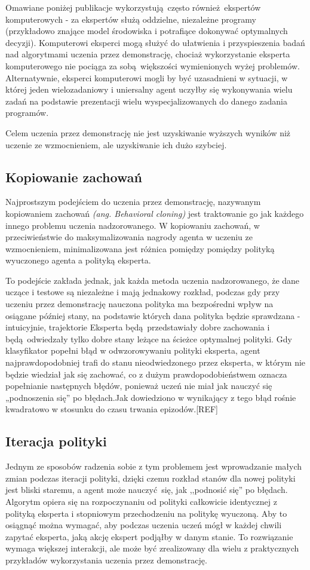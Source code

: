 Omawiane poniżej publikacje wykorzystują często również ekspertów komputerowych - za ekspertów służą oddzielne, niezależne programy (przykładowo znające model środowiska i potrafiące dokonywać optymalnych decyzji). Komputerowi eksperci mogą służyć do ułatwienia i przyspieszenia badań nad algorytmami uczenia przez demonstrację, chociaż wykorzystanie eksperta komputerowego nie pociąga za sobą większości wymienionych wyżej problemów. Alternatywnie, eksperci komputerowi mogli by być uzasadnieni w sytuacji, w której jeden wielozadaniowy i uniersalny agent uczyłby się wykonywania wielu zadań na podstawie prezentacji wielu wyspecjalizowanych do danego zadania programów.

Celem uczenia przez demonstrację nie jest uzyskiwanie wyższych wyników niż uczenie ze wzmocnieniem, ale uzyskiwanie ich dużo szybciej.

\subsection{Kopiowanie zachowań}

Najprostszym podejściem do uczenia przez demonstrację, nazywanym kopiowaniem zachowań \textit{(ang. Behavioral cloning)} jest traktowanie go jak każdego innego problemu uczenia nadzorowanego. W kopiowaniu zachowań, w przeciwieństwie do maksymalizowania nagrody agenta w uczeniu ze wzmocnieniem, minimalizowana jest różnica pomiędzy pomiędzy polityką wyuczonego agenta a polityką eksperta.

To podejście zakłada jednak, jak każda metoda uczenia nadzorowanego, że dane uczące i testowe są niezależne i mają jednakowy rozkład, podczas gdy przy uczeniu przez demonstrację nauczona polityka ma bezpośredni wpływ na osiągane później stany, na podstawie których dana polityka będzie sprawdzana - intuicyjnie, trajektorie Eksperta będą przedstawiały dobre zachowania i będą odwiedzały tylko dobre stany leżące na ścieżce optymalnej polityki. Gdy klasyfikator popełni błąd w odwzorowywaniu polityki eksperta, agent najprawdopodobniej trafi do stanu nieodwiedzonego przez eksperta, w którym nie będzie wiedział jak się zachować, co z dużym prawdopodobieństwem oznacza popełnianie następnych błędów, ponieważ uczeń nie miał jak nauczyć się „podnoszenia się” po błędach.Jak dowiedziono w \cite{DBLP:journals/corr/abs-1011-0686} wynikający z tego błąd rośnie kwadratowo w stosunku do czasu trwania epizodów.[REF]

\subsection{Iteracja polityki}
Jednym ze sposobów radzenia sobie z tym problemem jest wprowadzanie małych zmian podczas iteracji polityki, dzięki czemu rozkład stanów dla nowej polityki jest bliski staremu, a agent może nauczyć się, jak ,,podnosić się'' po błędach. Algorytm opiera się na rozpoczynaniu od polityki całkowicie identycznej z polityką eksperta i stopniowym przechodzeniu na politykę wyuczoną. Aby to osiągnąć można wymagać, aby podczas uczenia uczeń mógł w każdej chwili zapytać eksperta, jaką akcję ekspert podjąłby w danym stanie. To rozwiązanie wymaga większej interakcji, ale może być zrealizowany dla wielu z praktycznych przykładów wykorzystania uczenia przez demonstrację.

